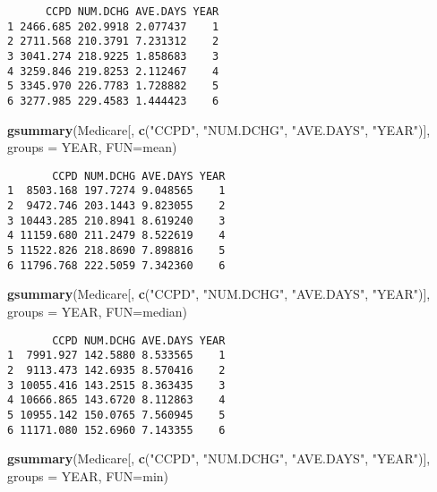 \documentclass[]{book}
\newenvironment{Shaded}{\begin{snugshade}}{\end{snugshade}}
\newcommand{\DataTypeTok}[1]{\textcolor[rgb]{0.13,0.29,0.53}{#1}}
\newcommand{\KeywordTok}[1]{\textcolor[rgb]{0.13,0.29,0.53}{\textbf{#1}}}
\newcommand{\NormalTok}[1]{#1}
\newcommand{\StringTok}[1]{\textcolor[rgb]{0.31,0.60,0.02}{#1}}
\begin{document}
\begin{verbatim}
      CCPD NUM.DCHG AVE.DAYS YEAR
1 2466.685 202.9918 2.077437    1
2 2711.568 210.3791 7.231312    2
3 3041.274 218.9225 1.858683    3
4 3259.846 219.8253 2.112467    4
5 3345.970 226.7783 1.728882    5
6 3277.985 229.4583 1.444423    6
\end{verbatim}

\begin{Shaded}
\begin{Highlighting}[]
\KeywordTok{gsummary}\NormalTok{(Medicare[, }\KeywordTok{c}\NormalTok{(}\StringTok{"CCPD"}\NormalTok{, }\StringTok{"NUM.DCHG"}\NormalTok{, }\StringTok{"AVE.DAYS"}\NormalTok{, }\StringTok{"YEAR"}\NormalTok{)], }\DataTypeTok{groups =}\NormalTok{ YEAR, }\DataTypeTok{FUN=}\NormalTok{mean)}
\end{Highlighting}
\end{Shaded}

\begin{verbatim}
       CCPD NUM.DCHG AVE.DAYS YEAR
1  8503.168 197.7274 9.048565    1
2  9472.746 203.1443 9.823055    2
3 10443.285 210.8941 8.619240    3
4 11159.680 211.2479 8.522619    4
5 11522.826 218.8690 7.898816    5
6 11796.768 222.5059 7.342360    6
\end{verbatim}

\begin{Shaded}
\begin{Highlighting}[]
\KeywordTok{gsummary}\NormalTok{(Medicare[, }\KeywordTok{c}\NormalTok{(}\StringTok{"CCPD"}\NormalTok{, }\StringTok{"NUM.DCHG"}\NormalTok{, }\StringTok{"AVE.DAYS"}\NormalTok{, }\StringTok{"YEAR"}\NormalTok{)], }\DataTypeTok{groups =}\NormalTok{ YEAR, }\DataTypeTok{FUN=}\NormalTok{median)}
\end{Highlighting}
\end{Shaded}

\begin{verbatim}
       CCPD NUM.DCHG AVE.DAYS YEAR
1  7991.927 142.5880 8.533565    1
2  9113.473 142.6935 8.570416    2
3 10055.416 143.2515 8.363435    3
4 10666.865 143.6720 8.112863    4
5 10955.142 150.0765 7.560945    5
6 11171.080 152.6960 7.143355    6
\end{verbatim}

\begin{Shaded}
\begin{Highlighting}[]
\KeywordTok{gsummary}\NormalTok{(Medicare[, }\KeywordTok{c}\NormalTok{(}\StringTok{"CCPD"}\NormalTok{, }\StringTok{"NUM.DCHG"}\NormalTok{, }\StringTok{"AVE.DAYS"}\NormalTok{, }\StringTok{"YEAR"}\NormalTok{)], }\DataTypeTok{groups =}\NormalTok{ YEAR, }\DataTypeTok{FUN=}\NormalTok{min)}
\end{Highlighting}
\end{Shaded}
\end{document}
